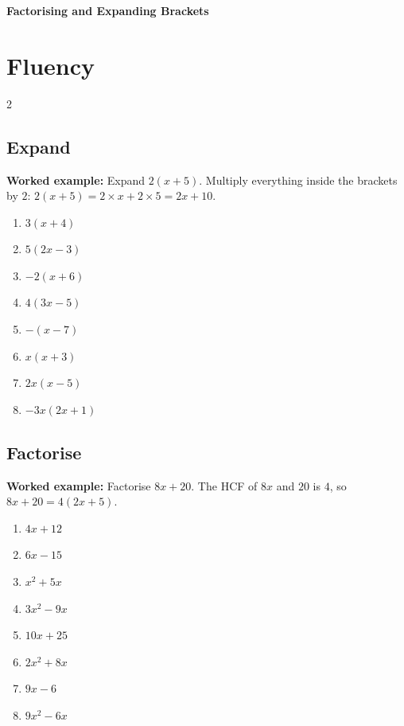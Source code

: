 \documentclass[11pt]{article}
\newcommand{\ans}{\hrulefill}
\newcommand{\anshere}{\par\vspace{0.2em}\noindent\ans\par\vspace{0.2em}}
\begin{document}
\thispagestyle{firstpage}

\begin{center}
  {\Large\bfseries Factorising and Expanding Brackets}
\end{center}
\vspace{0.2em}

\section*{Fluency}

\begin{multicols}{2}
\subsection*{Expand}
\noindent\textbf{Worked example:} Expand $2(x+5)$. Multiply everything inside the
brackets by $2$: $2(x+5) = 2\times x + 2\times 5 = 2x+10$.
\vspace{0.4em}
\begin{enumerate}[label=(\alph*)]
  \item $3(x+4)$
  \anshere
  \item $5(2x-3)$
  \anshere
  \item $-2(x+6)$
  \anshere
  \item $4(3x-5)$
  \anshere
  \item $-(x-7)$
  \anshere
  \item $x(x+3)$
  \anshere
  \item $2x(x-5)$
  \anshere
  \item $-3x(2x+1)$
  \anshere
\end{enumerate}

\columnbreak

\subsection*{Factorise}
\noindent\textbf{Worked example:} Factorise $8x+20$. The HCF of $8x$ and $20$ is $4$, so
$8x+20 = 4(2x+5)$.
\vspace{0.4em}
\begin{enumerate}[label=(\alph*)]
  \item $4x+12$
  \anshere
  \item $6x-15$
  \anshere
  \item $x^2+5x$
  \anshere
  \item $3x^2-9x$
  \anshere
  \item $10x+25$
  \anshere
  \item $2x^2+8x$
  \anshere
  \item $9x-6$
  \anshere
  \item $9x^2-6x$
  \anshere
\end{enumerate}
\end{multicols}
\end{document}
